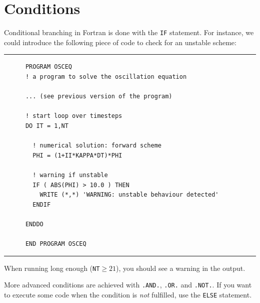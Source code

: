 \documentclass[a4paper]{article}
\begin{document}
\section{Conditions}
%
\par
Conditional branching in Fortran is done with the \verb+IF+ statement. For instance, we could introduce the following piece of code to check for an unstable scheme:
%
{\vspace{10pt}\hrule\small\vspace*{-2pt}\begin{verbatim}
	  PROGRAM OSCEQ
	  ! a program to solve the oscillation equation
	  
	  ... (see previous version of the program)
	  
	  ! start loop over timesteps
	  DO IT = 1,NT
	  
	    ! numerical solution: forward scheme
	    PHI = (1+II*KAPPA*DT)*PHI
	    
	    ! warning if unstable
	    IF ( ABS(PHI) > 10.0 ) THEN
	      WRITE (*,*) 'WARNING: unstable behaviour detected'
	    ENDIF
	  
	  ENDDO
	  
	  END PROGRAM OSCEQ
\end{verbatim}\hrule\vspace{5pt}}
%
\par
When running long enough (\verb+NT+$\geq21$), you should see a warning in the output.
%
\par
More advanced conditions are achieved with \verb+.AND.+, \verb+.OR.+ and \verb+.NOT.+. If you want to execute some code when the condition is \emph{not} fulfilled, use the \verb+ELSE+ statement.
%
\end{document}
